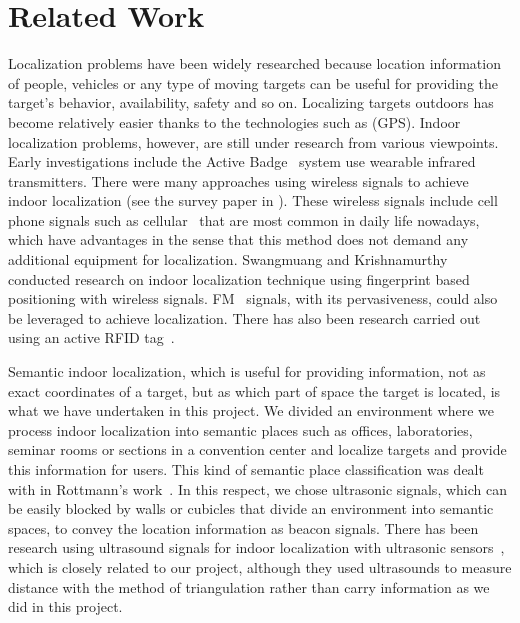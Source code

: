 \section{Related Work}
\label{sec:related-works}

Localization problems have been widely researched because location information of people, vehicles or any type of moving targets can be useful for providing the target's behavior, availability, safety and so on. Localizing targets outdoors has become relatively easier thanks to the technologies such as (GPS). Indoor localization problems, however, are still under research from various viewpoints. Early investigations include the Active Badge~\cite{want1992active} system use wearable infrared transmitters. There were many approaches using wireless signals to achieve indoor localization (see the survey paper in \cite{liu2007}). These wireless signals include cell phone signals such as cellular~\cite{otsason2005accurate} that are most common in daily life nowadays, which have advantages in the sense that this method does not demand any additional equipment for localization. Swangmuang and Krishnamurthy~\cite{Swangmuang2008} conducted research on indoor localization technique using fingerprint based positioning with wireless signals. FM~\cite{chen2012fm} signals, with its pervasiveness, could also be leveraged to achieve localization. There has also been research carried out using an active RFID tag~\cite{Jin2006, buettner2009recognizing}.

Semantic indoor localization, which is useful for providing information, not as exact coordinates of a target, but as which part of space the target is located, is what we have undertaken in this project. We divided an environment where we process indoor localization into semantic places such as offices, laboratories, seminar rooms or sections in a convention center and localize targets and provide this information for users. This kind of semantic place classification was dealt with in Rottmann's work~\cite{rottmann2005semantic}. In this respect, we chose ultrasonic signals, which can be easily blocked by walls or cubicles that divide an environment into semantic spaces, to convey the location information as beacon signals. There has been research using ultrasound signals for indoor localization with ultrasonic sensors~\cite{feng1997mobile, priyantha2005cricket}, which is closely related to our project, although they used ultrasounds to measure distance with the method of triangulation rather than carry information as we did in this project.

